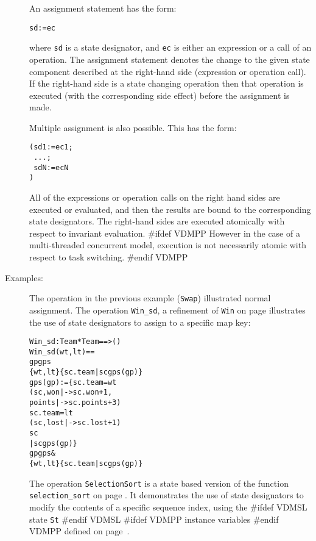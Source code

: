 \documentclass[\pformat,12pt]{article}
\begin{document}
\begin{description}
  An assignment statement has the form:
  \begin{alltt}
    sd := ec
  \end{alltt}
  where {\tt sd} is a state designator, and {\tt ec} is either an
  expression or a call of an operation. The assignment statement denotes the
  change to the given state component described at the right-hand side
  (expression or operation call). If the right-hand side is a state
  changing operation then that operation is executed (with the
  corresponding side effect) before the assignment is made.


  Multiple assignment is also possible. This has the form:
  \begin{alltt}
     (sd1 := ec1;
\           ...;
\           sdN := ecN
           )
  \end{alltt}
  All of the expressions or operation calls on the right hand sides are
  executed or evaluated, and then the results are bound to the
  corresponding state designators. The right-hand sides are executed
  atomically with respect to invariant evaluation. 
#ifdef VDMPP
 However in the case
  of a multi-threaded concurrent model, execution is not necessarily
  atomic with respect to task switching.
#endif VDMPP

\item[Examples:] The operation in the previous example (\texttt{Swap}) 
  illustrated normal assignment. The operation \texttt{Win\_sd}, a 
  refinement of \texttt{Win} on page \pageref{winDef} illustrates the use of 
  state designators to assign to a specific map key:
  \begin{alltt}
  Win_sd : Team * Team ==> ()
  Win_sd (wt,lt) ==
     gp  gps  
        \{wt,lt\}  \{sc.team | sc  gps(gp)\}
     gps(gp) := \{  sc.team = wt
                   (sc, won |-> sc.won + 1,
                               points |-> sc.points + 3)
                    sc.team = lt
                   (sc, lost |-> sc.lost + 1)
                    sc 
                 | sc  gps(gp)\}
    gp  gps & 
                 \{wt,lt\}  \{sc.team | sc  gps(gp)\}
  \end{alltt}
  The operation \texttt{SelectionSort} is a state based version of the 
  function \texttt{selection\_sort} on page \pageref{selectionSortdef}. It 
  demonstrates the use of state designators to modify the contents of a 
  specific sequence index, using the 
#ifdef VDMSL
state \texttt{St}
#endif VDMSL
#ifdef VDMPP
instance variables
#endif VDMPP
 defined on page~\pageref{stdef}. 
  \begin{alltt}
 

\end{alltt}
\end{description}
\end{document}
